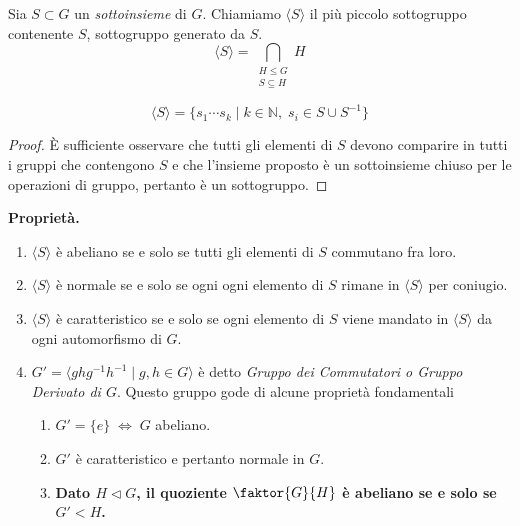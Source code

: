 \begin{multicols}{2}
\begin{definition}
	Sia $ S \subset G $ un \emph{sottoinsieme} di $ G $. Chiamiamo $ \langle S \rangle $ il più piccolo sottogruppo contenente $ S $, sottogruppo generato da $ S $. \[ \langle S \rangle = \bigcap_{\substack{H \leq G \\ S \subseteq H }} H  \]
\end{definition}
\begin{prop}
	\[ \langle S \rangle = \{ s_1 \cdots s_k \mid k \in \mathbb{N}, \; s_i \in S \cup S^{-1} \} \]
\end{prop}
\begin{proof}
	\`{E} sufficiente osservare che tutti gli elementi di $ S $ devono comparire in tutti i gruppi che contengono $ S $ e che l'insieme proposto è un sottoinsieme chiuso per le operazioni di gruppo, pertanto è un sottogruppo.
\end{proof}

\textbf{Proprietà.}
\begin{enumerate}
	\item $ \langle S \rangle $ è abeliano se e solo se tutti gli elementi di $ S $ commutano fra loro.
	\item $ \langle S \rangle $ è normale se e solo se ogni ogni elemento di $ S $ rimane in $ \langle S \rangle $ per coniugio.
	\item $ \langle S \rangle $ è caratteristico se e solo se ogni elemento di $ S $ viene mandato in $ \langle S \rangle $ da ogni automorfismo di $ G $.
	\item $ G' = \langle ghg^{-1}h^{-1} \mid g, h \in G \rangle $ è detto \emph{Gruppo dei Commutatori o Gruppo Derivato di $ G $}. Questo gruppo gode di alcune proprietà fondamentali
	
	\begin{enumerate}
		\item $ G' = \{ e \} \;\Leftrightarrow\; G $ abeliano.
		\item $ G' $ è caratteristico e pertanto normale in $ G $.
		\item \textbf{Dato $ H \lhd G $, il quoziente $ \faktor{G}{H} $ è abeliano se e solo se $ G' < H $.}
	
		
	\end{enumerate}


\end{enumerate}
\end{multicols}
